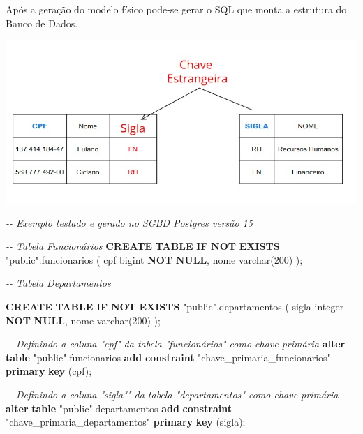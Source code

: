 \documentclass[
]{book}
\newenvironment{Shaded}{\begin{snugshade}}{\end{snugshade}}
\newcommand{\CommentTok}[1]{\textcolor[rgb]{0.56,0.35,0.01}{\textit{#1}}}
\newcommand{\ControlFlowTok}[1]{\textcolor[rgb]{0.13,0.29,0.53}{\textbf{#1}}}
\newcommand{\DataTypeTok}[1]{\textcolor[rgb]{0.13,0.29,0.53}{#1}}
\newcommand{\DecValTok}[1]{\textcolor[rgb]{0.00,0.00,0.81}{#1}}
\newcommand{\KeywordTok}[1]{\textcolor[rgb]{0.13,0.29,0.53}{\textbf{#1}}}
\newcommand{\NormalTok}[1]{#1}
\newcommand{\OtherTok}[1]{\textcolor[rgb]{0.56,0.35,0.01}{#1}}
\begin{document}
Após a geração do modelo físico pode-se gerar o SQL que monta a estrutura do Banco de Dados.

\includegraphics{images/5-bi/06-modelo_fisico.jpg}

\begin{Shaded}
\begin{Highlighting}[]
\CommentTok{{-}{-} Exemplo testado e gerado no SGBD Postgres versão 15}

\CommentTok{{-}{-} Tabela Funcionários}
\KeywordTok{CREATE} \KeywordTok{TABLE} \ControlFlowTok{IF} \KeywordTok{NOT} \KeywordTok{EXISTS} \OtherTok{"public"}\NormalTok{.funcionarios}
\NormalTok{(}
\NormalTok{    cpf bigint }\KeywordTok{NOT} \KeywordTok{NULL}\NormalTok{,}
\NormalTok{    nome }\DataTypeTok{varchar}\NormalTok{(}\DecValTok{200}\NormalTok{)}
\NormalTok{);}

\CommentTok{{-}{-} Tabela Departamentos}

\KeywordTok{CREATE} \KeywordTok{TABLE} \ControlFlowTok{IF} \KeywordTok{NOT} \KeywordTok{EXISTS} \OtherTok{"public"}\NormalTok{.departamentos}
\NormalTok{(}
\NormalTok{    sigla }\DataTypeTok{integer} \KeywordTok{NOT} \KeywordTok{NULL}\NormalTok{,}
\NormalTok{    nome }\DataTypeTok{varchar}\NormalTok{(}\DecValTok{200}\NormalTok{)}
\NormalTok{);}

\CommentTok{{-}{-} Definindo a coluna "cpf" da tabela "funcionários" como chave primária}
\KeywordTok{alter} \KeywordTok{table} \OtherTok{"public"}\NormalTok{.funcionarios }\KeywordTok{add} \KeywordTok{constraint} \OtherTok{"chave\_primaria\_funcionarios"} \KeywordTok{primary} \KeywordTok{key}\NormalTok{ (cpf);}

\CommentTok{{-}{-} Definindo a coluna "sigla"" da tabela "departamentos" como chave primária}
\KeywordTok{alter} \KeywordTok{table} \OtherTok{"public"}\NormalTok{.departamentos }\KeywordTok{add} \KeywordTok{constraint} \OtherTok{"chave\_primaria\_departamentos"} \KeywordTok{primary} \KeywordTok{key}\NormalTok{ (sigla);}


\end{Highlighting}
\end{Shaded}
\end{document}
